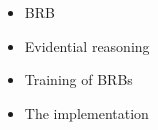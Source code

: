 \begin{itemize}
    \item BRB
    \item Evidential reasoning
    \item Training of BRBs
    \item The implementation
\end{itemize}